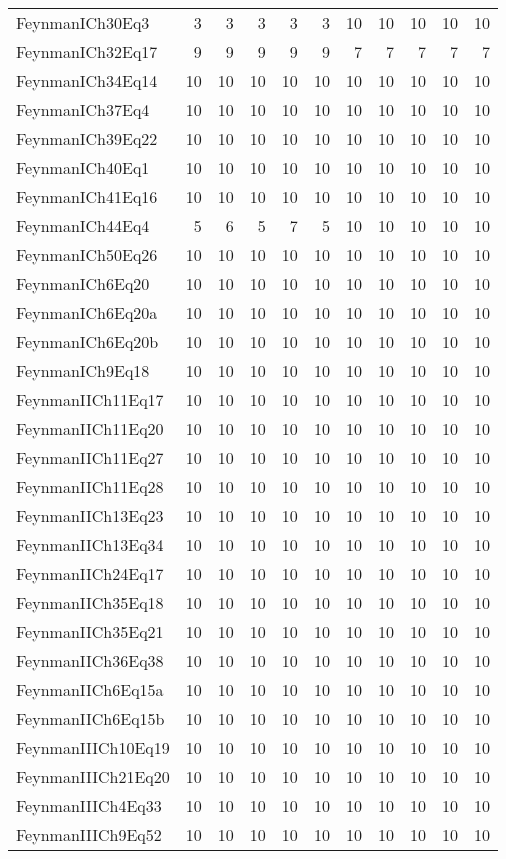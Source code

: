\begin{tabular}{lrrrrrrrrrr}
FeynmanICh30Eq3 & 3 & 3 & 3 & 3 & 3 & 10 & 10 & 10 & 10 & 10 \\
FeynmanICh32Eq17 & 9 & 9 & 9 & 9 & 9 & 7 & 7 & 7 & 7 & 7 \\
FeynmanICh34Eq14 & 10 & 10 & 10 & 10 & 10 & 10 & 10 & 10 & 10 & 10 \\
FeynmanICh37Eq4 & 10 & 10 & 10 & 10 & 10 & 10 & 10 & 10 & 10 & 10 \\
FeynmanICh39Eq22 & 10 & 10 & 10 & 10 & 10 & 10 & 10 & 10 & 10 & 10 \\
FeynmanICh40Eq1 & 10 & 10 & 10 & 10 & 10 & 10 & 10 & 10 & 10 & 10 \\
FeynmanICh41Eq16 & 10 & 10 & 10 & 10 & 10 & 10 & 10 & 10 & 10 & 10 \\
FeynmanICh44Eq4 & 5 & 6 & 5 & 7 & 5 & 10 & 10 & 10 & 10 & 10 \\
FeynmanICh50Eq26 & 10 & 10 & 10 & 10 & 10 & 10 & 10 & 10 & 10 & 10 \\
FeynmanICh6Eq20 & 10 & 10 & 10 & 10 & 10 & 10 & 10 & 10 & 10 & 10 \\
FeynmanICh6Eq20a & 10 & 10 & 10 & 10 & 10 & 10 & 10 & 10 & 10 & 10 \\
FeynmanICh6Eq20b & 10 & 10 & 10 & 10 & 10 & 10 & 10 & 10 & 10 & 10 \\
FeynmanICh9Eq18 & 10 & 10 & 10 & 10 & 10 & 10 & 10 & 10 & 10 & 10 \\
FeynmanIICh11Eq17 & 10 & 10 & 10 & 10 & 10 & 10 & 10 & 10 & 10 & 10 \\
FeynmanIICh11Eq20 & 10 & 10 & 10 & 10 & 10 & 10 & 10 & 10 & 10 & 10 \\
FeynmanIICh11Eq27 & 10 & 10 & 10 & 10 & 10 & 10 & 10 & 10 & 10 & 10 \\
FeynmanIICh11Eq28 & 10 & 10 & 10 & 10 & 10 & 10 & 10 & 10 & 10 & 10 \\
FeynmanIICh13Eq23 & 10 & 10 & 10 & 10 & 10 & 10 & 10 & 10 & 10 & 10 \\
FeynmanIICh13Eq34 & 10 & 10 & 10 & 10 & 10 & 10 & 10 & 10 & 10 & 10 \\
FeynmanIICh24Eq17 & 10 & 10 & 10 & 10 & 10 & 10 & 10 & 10 & 10 & 10 \\
FeynmanIICh35Eq18 & 10 & 10 & 10 & 10 & 10 & 10 & 10 & 10 & 10 & 10 \\
FeynmanIICh35Eq21 & 10 & 10 & 10 & 10 & 10 & 10 & 10 & 10 & 10 & 10 \\
FeynmanIICh36Eq38 & 10 & 10 & 10 & 10 & 10 & 10 & 10 & 10 & 10 & 10 \\
FeynmanIICh6Eq15a & 10 & 10 & 10 & 10 & 10 & 10 & 10 & 10 & 10 & 10 \\
FeynmanIICh6Eq15b & 10 & 10 & 10 & 10 & 10 & 10 & 10 & 10 & 10 & 10 \\
FeynmanIIICh10Eq19 & 10 & 10 & 10 & 10 & 10 & 10 & 10 & 10 & 10 & 10 \\
FeynmanIIICh21Eq20 & 10 & 10 & 10 & 10 & 10 & 10 & 10 & 10 & 10 & 10 \\
FeynmanIIICh4Eq33 & 10 & 10 & 10 & 10 & 10 & 10 & 10 & 10 & 10 & 10 \\
FeynmanIIICh9Eq52 & 10 & 10 & 10 & 10 & 10 & 10 & 10 & 10 & 10 & 10 \\
\bottomrule
\end{tabular}
